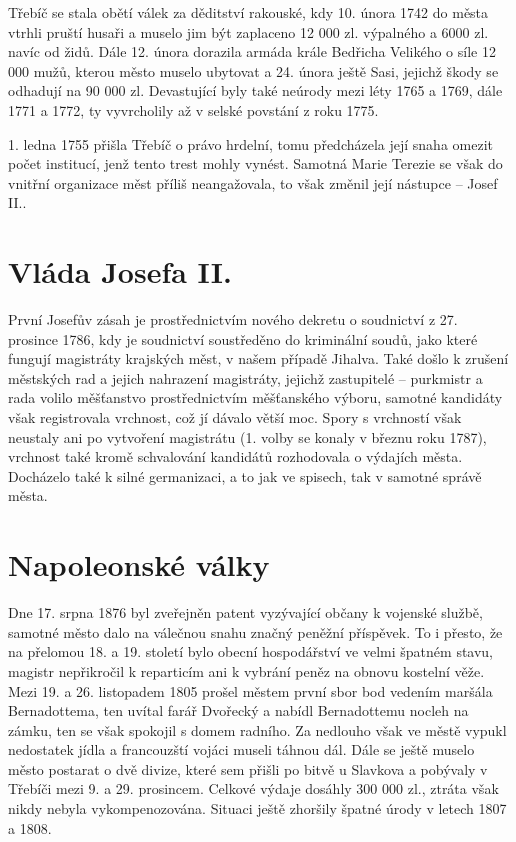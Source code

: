 \documentclass[a4paper,oneside,12p]{report}
\begin{document}
Třebíč se stala obětí válek za děditství rakouské, kdy 10. února 1742 do města vtrhli pruští husaři a muselo jim být zaplaceno 12 000 zl. výpalného a 6000 zl. navíc od židů.
Dále 12. února dorazila armáda  krále Bedřicha Velikého o síle 12 000 mužů, kterou město muselo ubytovat a 24. února ještě Sasi, jejichž škody se odhadují na 90 000 zl. %
Devastující byly také neúrody mezi léty 1765 a 1769, dále 1771 a 1772, ty vyvrcholily až v selské povstání z roku 1775.

1. ledna 1755 přišla Třebíč o právo hrdelní, tomu předcházela její snaha omezit počet institucí, jenž tento trest mohly vynést.
Samotná Marie Terezie se však do vnitřní organizace měst příliš neangažovala, to však změnil její nástupce -- Josef II..

\section{Vláda Josefa II.}

První Josefův zásah je prostřednictvím nového dekretu o soudnictví z 27. prosince 1786, kdy je soudnictví soustředěno do kriminální soudů, jako které fungují magistráty krajských měst, v našem případě Jihalva.
Také došlo k zrušení městských rad a jejich nahrazení magistráty, jejichž zastupitelé -- purkmistr a rada volilo měšťanstvo prostřednictvím měšťanského výboru, samotné kandidáty však registrovala vrchnost, což jí dávalo větší moc.
Spory s vrchností však neustaly ani po vytvoření magistrátu (1. volby se konaly v březnu roku 1787), vrchnost také kromě schvalování kandidátů rozhodovala o výdajích města.
Docházelo také k silné germanizaci, a to jak ve spisech, tak v samotné správě města. %

\section{Napoleonské války}

Dne 17. srpna 1876 byl zveřejněn patent vyzývající občany k vojenské službě, samotné město dalo na válečnou snahu značný peněžní příspěvek.
To i přesto, že na přelomou 18. a 19. století bylo obecní hospodářství ve velmi špatném stavu, magistr nepřikročil k reparticím ani k vybrání peněz na obnovu kostelní věže.
Mezi 19. a 26. listopadem 1805 prošel městem první sbor bod vedením maršála Bernadottema, ten uvítal farář Dvořecký a nabídl Bernadottemu nocleh na zámku, ten se však spokojil s domem radního.
Za nedlouho však ve městě vypukl nedostatek jídla a francouzští vojáci museli táhnou dál.
Dále se ještě muselo město postarat o dvě divize, které sem přišli po bitvě u Slavkova a  pobývaly v Třebíči mezi 9. a 29. prosincem.
Celkové výdaje dosáhly 300 000 zl., ztráta však nikdy nebyla vykompenozována.
Situaci ještě zhoršily špatné úrody v letech 1807 a 1808.
\end{document}
